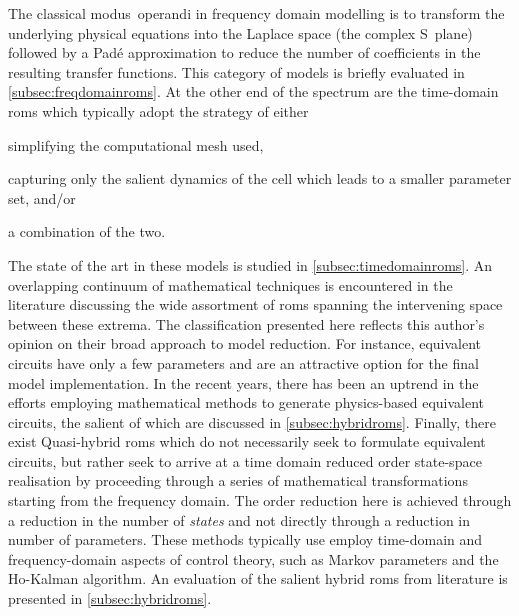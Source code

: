 The classical \mbox{modus operandi} in
frequency domain modelling is to transform the underlying physical equations
into the Laplace space (the complex S~plane) followed by a Padé approximation to reduce the number
of coefficients in the resulting transfer functions. This category of models is
briefly evaluated in \cref{subsec:freqdomainroms}. At the other end of the
spectrum are the time-domain \glspl{rom} which typically adopt the strategy of either
\begin{enumerate*}[label=\itshape\alph*\upshape)]
    \item simplifying the computational mesh used,
    \item capturing only the salient dynamics of the cell which leads to a smaller parameter set,
        and/or
    \item a combination of the two.
\end{enumerate*}
The state of the art in these models is studied in \cref{subsec:timedomainroms}.
An overlapping continuum of mathematical techniques is encountered in the literature discussing the wide assortment of \glspl{rom} spanning the intervening space between these
extrema. The classification
presented here reflects this author's opinion on their broad approach to model
reduction. For instance, equivalent circuits have only a few
parameters and are an attractive option for the final model
implementation. In the recent years, there has been an uptrend in the
efforts employing mathematical methods to generate physics-based equivalent
circuits, the salient of which are discussed in \cref{subsec:hybridroms}.
Finally, there exist Quasi-hybrid \glspl{rom} which do not necessarily seek to
formulate equivalent circuits, but rather seek to arrive at a time domain reduced order
state-space realisation by proceeding through a series of mathematical transformations
starting from the frequency domain. The order reduction here is achieved
through a reduction in the number of \emph{states} and not directly through a
reduction in number of parameters. These methods typically  use employ
time-domain and frequency-domain aspects of control theory, such as
Markov parameters and the Ho-Kalman algorithm. An evaluation of the salient
hybrid \glspl{rom} from literature is presented in \cref{subsec:hybridroms}.


